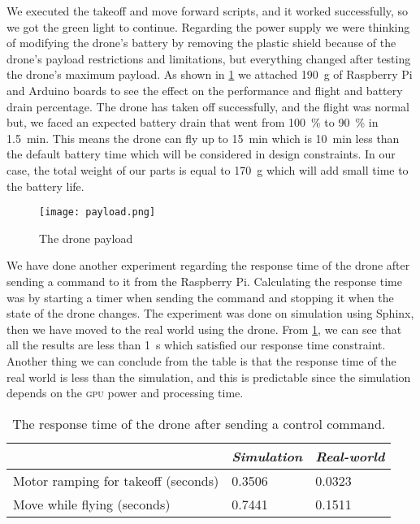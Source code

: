 \documentclass[../main.tex]{subfiles}
\begin{document}
We executed the takeoff and move forward scripts,
and it worked successfully, so we got the green 
light to continue. 
Regarding the power supply we were thinking 
of modifying the drone's battery by removing the 
plastic shield because of the drone's payload restrictions 
and limitations, but everything changed after testing 
the drone's maximum payload. As shown in \cref{fig:payload}
we attached \SI{190}{\gram} of Raspberry Pi and Arduino boards
to see the effect on the performance and flight and
battery drain percentage. 
The drone has taken off  successfully, 
and the flight was normal but, we faced an expected 
battery drain that went from 
\SI{100}{\percent} to \SI{90}{\percent} in 
\SI{1.5}{\minute}.
This means the drone can fly up to 
\SI{15}{\minute} which is \SI{10}{\minute} 
less than the default battery time 
which will be considered in design constraints.
In our case, the total weight of our parts is equal
to \SI{170}{\gram} which will add small time
to the battery life.

\begin{figure}[tbp]
	\centering
	\texttt{[image: payload.png]}
	\caption{The drone payload}
	\label{fig:payload}
\end{figure} 


We have done another experiment regarding the response time 
of the drone after sending a command to it from the Raspberry Pi. 
Calculating the response time was by starting a timer when 
sending the command and stopping it when the 
state of the drone changes. 
The experiment was done on simulation using Sphinx,
then we have moved to the real world using the \anafi drone.
From \cref{tab:respone-time}, 
we can see that all the results are less than \SI{1}{\second}
which satisfied our response time constraint.
Another thing we can conclude from the table is that 
the response time of the real world is less than 
the simulation, and this is predictable since the simulation
depends on the \textsc{gpu} power and processing time. 

\begin{table}[tbp]
	\centering
	\caption{The response time of the drone after sending a control command.}
	\label{tab:respone-time}
	\begin{tabular}{ p{6cm} p{4cm} p{4cm} }
		\toprule
		\textit{} & \textit{Simulation} & \textit{Real-world}\\ \midrule
		Motor ramping for takeoff (seconds)  & 0.3506 & 0.0323     \\
		Move while flying (seconds) & 0.7441  & 0.1511   \\
		\bottomrule
	\end{tabular}
\end{table} 
\end{document}
